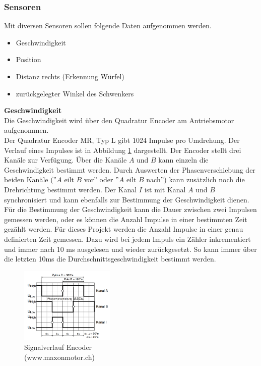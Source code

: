 \documentclass[../../main.tex]{subfiles}
\begin{document}
    \subsubsection{Sensoren} \label{et_sensoren}
    Mit diversen Sensoren sollen folgende Daten aufgenommen werden.
    \begin{itemize}
        \item Geschwindigkeit
        \item Position
        \item Distanz rechts (Erkennung Würfel)
        \item zurückgelegter Winkel des Schwenkers
    \end{itemize}

    \textbf{Geschwindigkeit}\\
    Die Geschwindigkeit wird über den Quadratur Encoder am Antriebsmotor aufgenommen.\\
    Der Quadratur Encoder MR, Typ L gibt $1024$ Impulse pro Umdrehung. Der Verlauf eines Impulses ist in Abbildung \ref{fig:et_encoder} dargestellt. Der Encoder stellt drei Kanäle zur Verfügung. Über die Kanäle $A$ und $B$ kann einzeln die Geschwindigkeit bestimmt werden. Durch Auswerten der Phasenverschiebung der beiden Kanäle (''$A$ eilt $B$ vor'' oder ''$A$ eilt $B$ nach'') kann zusätzlich noch die Drehrichtung bestimmt werden. Der Kanal $I$ ist mit Kanal $A$ und $B$ synchronisiert und kann ebenfalls zur Bestimmung der Geschwindigkeit dienen.\\
    Für die Bestimmung der Geschwindigkeit kann die Dauer zwischen zwei Impulsen gemessen werden, oder es können die Anzahl Impulse in einer bestimmten Zeit gezählt werden. Für dieses Projekt werden die Anzahl Impulse in einer genau definierten Zeit gemessen. Dazu wird bei jedem Impuls ein Zähler inkrementiert und immer nach 10 ms ausgelesen und wieder zurückgesetzt. So kann immer über die letzten 10ms die Durchschnittsgeschwindigkeit bestimmt werden.\\

    \begin{figure}
        \centering
        \includegraphics[width=0.4\textwidth]{../../images/et/Encoder_MR.png}
        \caption {Signalverlauf Encoder\\ (www.maxonmotor.ch)}
        \label{fig:et_encoder}
    \end{figure}
\end{document}
